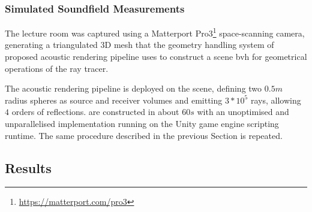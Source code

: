 \subsubsection{Simulated Soundfield Measurements}
The lecture room was captured using a Matterport Pro3\footnote{\url{https://matterport.com/pro3}} space-scanning camera, generating a triangulated 3D mesh that the geometry handling system of proposed acoustic rendering pipeline uses to construct a scene \acrshort{bvh} for geometrical operations of the ray tracer.\par
The acoustic rendering pipeline is deployed on the scene, defining two $0.5m$ radius spheres as source and receiver volumes and emitting $3*10^5$ rays, allowing $4$ orders of reflections.  are constructed in about $60s$ with an unoptimised and unparallelised implementation running on the Unity game engine scripting runtime. The same procedure described in the previous Section is repeated. \par

\subsection{Results}







